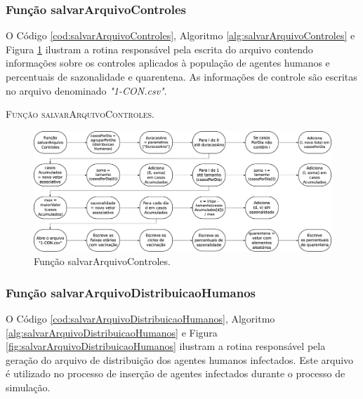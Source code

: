 \newpage

\subsubsection{Função salvarArquivoControles}

O Código \ref{cod:salvarArquivoControles}, Algoritmo \ref{alg:salvarArquivoControles} e Figura \ref{fig:salvarArquivoControles} ilustram a rotina responsável pela escrita do arquivo contendo informações sobre os controles aplicados à população de agentes humanos e percentuais de sazonalidade e quarentena. As informações de controle são escritas no arquivo denominado \textit{"1-CON.csv"}. 



\begin{algorithm}[H]
   \SetAlgoLined   
   
   \caption{\textsc{Função salvarArquivoControles.}}
   \label{alg:salvarArquivoControles}
\end{algorithm}

\begin{figure}[H]
  \centering
  \includegraphics[width=1\textwidth]{Figuras/Simula/Fluxos/salvarArquivoControles.eps}
  \caption{Função salvarArquivoControles.}
  \label{fig:salvarArquivoControles}
\end{figure} 

\newpage

\subsubsection{Função salvarArquivoDistribuicaoHumanos}

O Código \ref{cod:salvarArquivoDistribuicaoHumanos}, Algoritmo \ref{alg:salvarArquivoDistribuicaoHumanos} e Figura \ref{fig:salvarArquivoDistribuicaoHumanos} ilustram a rotina responsável pela geração do arquivo de distribuição dos agentes humanos infectados. Este arquivo é utilizado no processo de inserção de agentes infectados durante o processo de simulação. 

